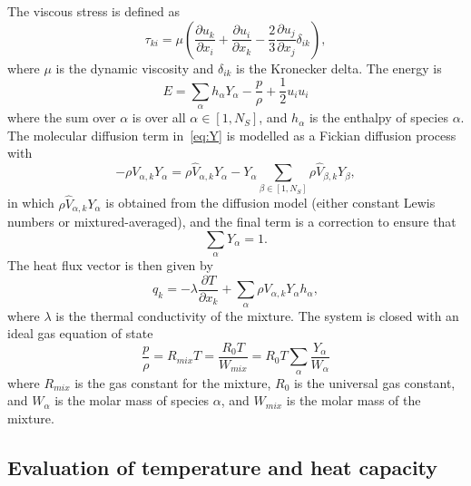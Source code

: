 \documentclass[notitlepage]{revtex4-1}
\begin{document}
The viscous stress is defined as 
\begin{equation}\tau_{ki}=\mu\left(\frac{\partial{u}_{k}}{\partial{x}_{i}}+\frac{\partial{u}_{i}}{\partial{x}_{k}}-\frac{2}{3}\frac{\partial{u}_{j}}{\partial{x}_{j}}\delta_{ik}\right)\label{eq:tau},\end{equation}
where $\mu$ is the dynamic viscosity and $\delta_{ik}$ is the Kronecker delta. The energy is
\begin{equation}E=\displaystyle\sum_{\alpha}h_{\alpha}Y_{\alpha}-\frac{p}{\rho}+\frac{1}{2}{u}_{i}{u}_{i}\label{eq:E}\end{equation}
where the sum over $\alpha$ is over all $\alpha\in\left[1,N_{S}\right]$, and $h_{\alpha}$ is the enthalpy of species $\alpha$. The molecular diffusion term in~\eqref{eq:Y} is modelled as a Fickian diffusion process with
\begin{equation}-\rho{V}_{\alpha,k}Y_{\alpha}=\rho\hat{V}_{\alpha,k}Y_{\alpha}-Y_{\alpha}\displaystyle\sum_{\beta\in\left[1,N_{S}\right]}\rho\hat{V}_{\beta,k}Y_{\beta}\label{eq:fickdiff},\end{equation}
in which $\rho\hat{V}_{\alpha,k}Y_{\alpha}$ is obtained from the diffusion model (either constant Lewis numbers or mixtured-averaged), and the final term is a correction to ensure that 
\begin{equation}\displaystyle\sum_{\alpha}Y_{\alpha}=1.\label{eq:sumY}\end{equation}
The heat flux vector is then given by
\begin{equation}q_{k}=-\lambda\frac{\partial{T}}{\partial{x}_{k}}+\displaystyle\sum_{\alpha}\rho{V}_{\alpha,k}Y_{\alpha}h_{\alpha}\label{eq:hfv},\end{equation}
where $\lambda$ is the thermal conductivity of the mixture.
The system is closed with an ideal gas equation of state
\begin{equation}\frac{p}{\rho}={R}_{mix}T=\frac{R_{0}T}{W_{mix}}={R}_{0}T\displaystyle\sum_{\alpha}\frac{Y_{\alpha}}{W_{\alpha}}\label{eq:eos}\end{equation}
where $R_{mix}$ is the gas constant for the mixture, $R_{0}$ is the universal gas constant, and $W_{\alpha}$ is the molar mass of species $\alpha$, and $W_{mix}$ is the molar mass of the mixture.

\subsection{Evaluation of temperature and heat capacity}
\end{document}

